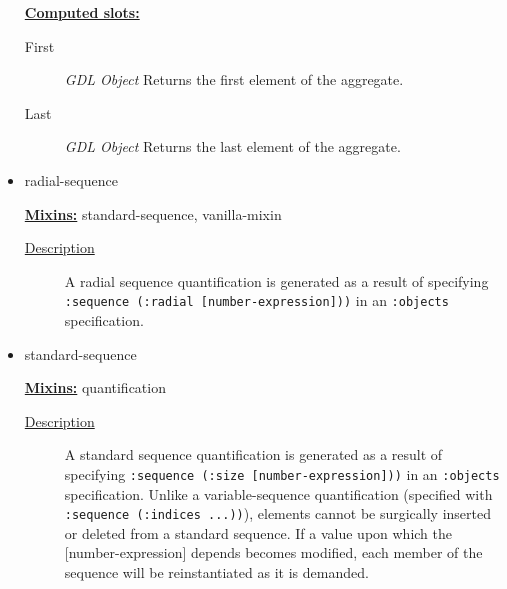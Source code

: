 \documentclass [11pt]{book}
\begin{document}
\begin{itemize}
\begin{description}
\end{description}








\textbf{
\underline{Computed slots:}}

\begin{description}

\item [First]
\emph{GDL Object} Returns the first element of the aggregate.


\item [Last]
\emph{GDL Object} Returns the last element of the aggregate.


\end{description}







\item {}radial-sequence


\textbf{
\underline{Mixins:}} standard-sequence, vanilla-mixin





\begin{description}

\item [
\underline{Description}]


A radial sequence quantification is generated as a result of specifying 
\texttt{:sequence (:radial [number-expression]))} in an \texttt{:objects} specification.



\end{description}









\item {}standard-sequence


\textbf{
\underline{Mixins:}} quantification





\begin{description}

\item [
\underline{Description}]


A standard sequence quantification is generated as a result of specifying 
\texttt{:sequence (:size [number-expression]))} in an \texttt{:objects} specification. Unlike a variable-sequence 
quantification (specified with \texttt{:sequence (:indices ...))}), elements cannot be surgically inserted or 
deleted from a standard sequence. If a value upon which the [number-expression] depends becomes modified,
each member of the sequence will be reinstantiated as it is demanded.




\end{description}
\end{itemize}
\end{document}
